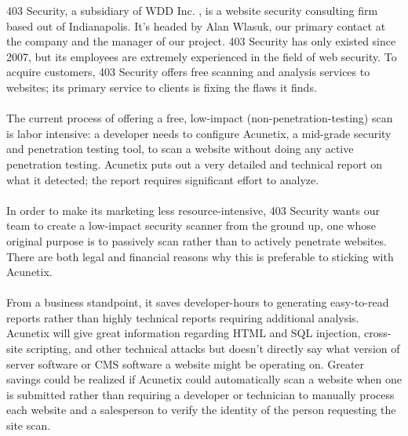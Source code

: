 	403 Security, a subsidiary of WDD Inc. , is a website security consulting firm based out of Indianapolis.  It’s headed by Alan Wlasuk, our primary contact at the company and the manager of our project. 403 Security has only existed  since 2007, but its employees are extremely experienced in the field of web security. To acquire customers, 403 Security offers free scanning and analysis services to websites; its primary service to clients is fixing the flaws it finds.\\\\
The current process of offering a free, low-impact (non-penetration-testing) scan is labor intensive: a developer needs to configure Acunetix, a mid-grade security and penetration testing tool, to scan a website without doing any active penetration testing. Acunetix puts out a very detailed and technical report on what it detected; the report requires significant effort to analyze.\\\\
In order to make its marketing less resource-intensive, 403 Security wants our team to create a low-impact security scanner from the ground up, one whose original purpose is to passively scan rather than to actively penetrate websites. There are both legal and financial reasons why this is preferable to sticking with Acunetix.\\\\
From a business standpoint, it saves developer-hours to  generating easy-to-read reports rather than highly technical reports requiring additional analysis. Acunetix will give great information regarding HTML and SQL injection, cross-site scripting, and other technical attacks but doesn’t directly say what version of server software or CMS software a website might be operating on. Greater savings could be realized if Acunetix could automatically scan a website when one is submitted rather than requiring a developer or technician to manually process each website and a salesperson to verify the identity of the person requesting the site scan.\\\\
